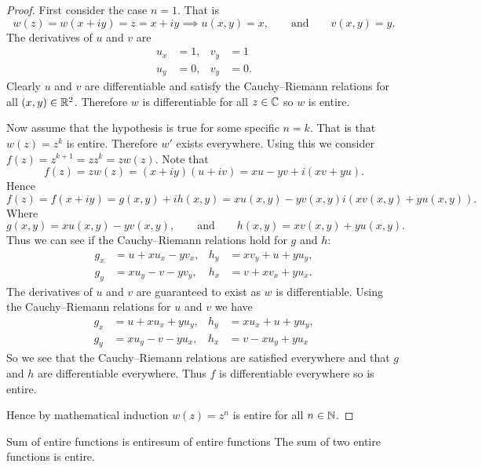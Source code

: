 \documentclass{article}
\begin{document}
    \begin{proof}
        First consider the case \(n = 1\).
        That is
        \[w(z) = w(x + iy) = z = x + iy \implies u(x, y) = x, \qquad \text{and} \qquad v(x, y) = y.\]
        The derivatives of \(u\) and \(v\) are
        \begin{align*}
            u_x &= 1, & v_y &= 1\\
            u_y &= 0, & v_y &= 0.
        \end{align*}
        Clearly \(u\) and \(v\) are differentiable and satisfy the Cauchy--Riemann relations for all \((x, y)\in\mathbb{R}^2\).
        Therefore \(w\) is differentiable for all \(z\in\mathbb{C}\) so \(w\) is entire.
        
        Now assume that the hypothesis is true for some specific \(n = k\).
        That is that \(w(z) = z^k\) is entire.
        Therefore \(w'\) exists everywhere.
        Using this we consider \(f(z) = z^{k + 1} = zz^k = zw(z)\).
        Note that
        \[f(z) = zw(z) = (x + iy)(u + iv) = xu - yv + i(xv + yu).\]
        Hence
        \[f(z) = f(x + iy) = g(x, y) + ih(x, y) = xu(x, y) - yv(x, y) i(xv(x, y) + yu(x, y)).\]
        Where
        \[g(x, y) = xu(x, y) - yv(x, y), \qquad\text{and}\qquad h(x, y) = xv(x, y) + yu(x, y).\]
        Thus we can see if the Cauchy--Riemann relations hold for \(g\) and \(h\):
        \begin{align*}
            g_x &= u + xu_x - yv_x, & h_y &= xv_y + u + yu_y,\\
            g_y &= xu_y - v - yv_y, & h_x &= v + xv_x + yu_x.
        \end{align*}
        The derivatives of \(u\) and \(v\) are guaranteed to exist as \(w\) is differentiable.
        Using the Cauchy--Riemann relations for \(u\) and \(v\) we have
        \begin{align*}
            g_x &= u + xu_x + yu_y, & h_y &= xu_x + u + yu_y,\\
            g_y &= xu_y - v - yu_x, & h_x &= v - xu_y + yu_x
        \end{align*}
        So we see that the Cauchy--Riemann relations are satisfied everywhere and that \(g\) and \(h\) are differentiable everywhere.
        Thus \(f\) is differentiable everywhere so is entire.
        
        Hence by mathematical induction \(w(z) = z^n\) is entire for all \(n\in\mathbb{N}\).
    \end{proof}
    \begin{lemma}{Sum of entire functions is entire}{sum of entire functions}
        The sum of two entire functions is entire.
    \end{lemma}
\end{document}
